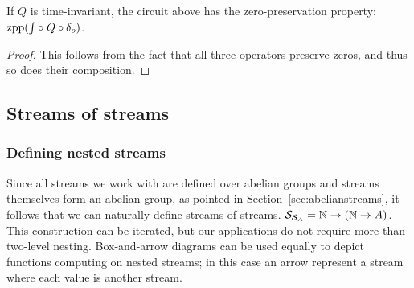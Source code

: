 \begin{center}
\end{center}


\begin{proposition}
If $Q$ is time-invariant, the circuit above has the zero-preservation
property: $\mbox{zpp}(\int \circ\; Q \circ \delta_o)$.
\end{proposition}
\begin{proof}
  This follows from the fact that all three operators preserve zeros, and thus so 
  does their composition.
\end{proof}

\subsection{Streams of streams}\label{sec:nested}

\subsubsection{Defining nested streams}

Since all streams we work with are defined over abelian groups
and streams themselves form an abelian group, as pointed in Section~\ref{sec:abelianstreams},
it follows that we can naturally define streams of streams.
$\mathcal{S}_{\mathcal{S}_{A}} = \mathbb{N} \rightarrow (\mathbb{N} \rightarrow A)$.  This construction
can be iterated, but our applications do not require more than 
two-level nesting.  Box-and-arrow diagrams can be used equally to
depict functions computing on nested streams; in this case an
arrow represent a stream where each value is another stream.

\newcommand{\ssa}[1]{
\setsepchar{ }
\readlist\arg{#1}
\begin{bmatrix}
   \begin{array}{ccccccc}
        {[} & \arg[1] & \arg[2] & \arg[3] & \arg[4] & \cdots & {]} \\
        {[} & \arg[5] & \arg[6] & \arg[7] & \arg[8] & \cdots & {]} \\
        {[} & \arg[9] & \arg[10] & \arg[11] & \arg[12] & \cdots & {]} \\
        {[} & \arg[13] & \arg[14] & \arg[15] & \arg[16] & \cdots & {]} \\
        \multicolumn{7}{c}{\vdots}
   \end{array}
\end{bmatrix}
}

